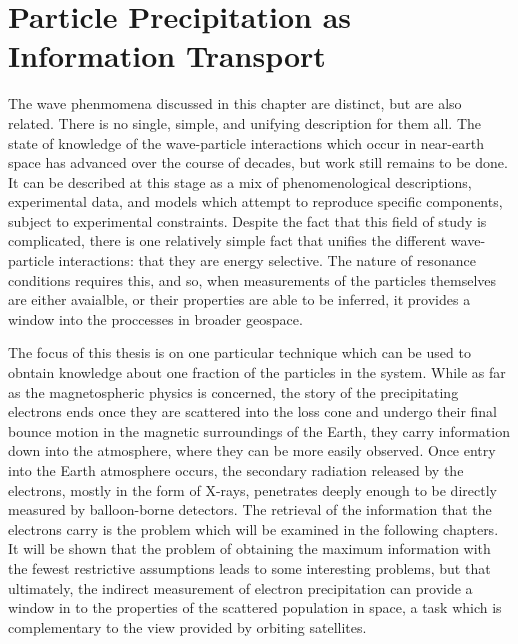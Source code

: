 \section{Particle Precipitation as Information Transport}

The wave phenmomena discussed in this chapter are distinct, but are also related. There is no single, simple, and unifying description for them all. The state of knowledge of the wave-particle interactions which occur in near-earth space has advanced over the course of decades, but work still remains to be done. It can be described at this stage as a mix of phenomenological descriptions, experimental data, and models which attempt to reproduce specific components, subject to experimental constraints. Despite the fact that this field of study is complicated, there is one relatively simple fact that unifies the different wave-particle interactions: that they are energy selective. The nature of resonance conditions requires this, and so, when measurements of the particles themselves are either avaialble, or their properties are able to be inferred, it provides a window into the proccesses in broader geospace.

The focus of this thesis is on one particular technique which can be used to obntain knowledge about one fraction of the particles in the system. While as far as the magnetospheric physics is concerned, the story of the precipitating electrons ends once they are scattered into the loss cone and undergo their final bounce motion in the magnetic surroundings of the Earth, they carry information down into the atmosphere, where they can be more easily observed. Once entry into the Earth atmosphere occurs, the secondary radiation released by the electrons, mostly in the form of X-rays, penetrates deeply enough to be directly measured by balloon-borne detectors. 
 The retrieval of the information that the electrons carry is the problem which will be examined in the following chapters. It will be shown that the problem of obtaining the maximum information with the fewest restrictive assumptions leads to some interesting problems, but that ultimately, the indirect measurement of electron precipitation can provide a window in to the properties of the scattered population in space, a task which is complementary to the view provided by orbiting satellites. 
